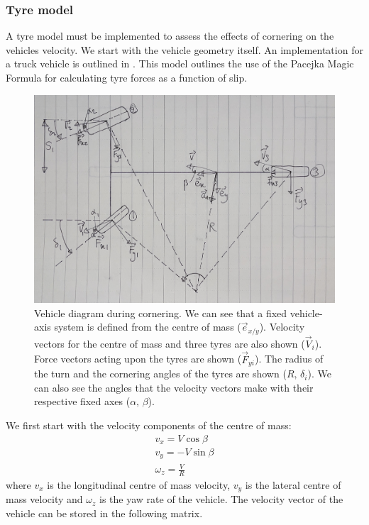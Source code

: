 \documentclass[11pt]{article}
\numberwithin{equation}{section}
\begin{document}
\subsubsection{Tyre model}
A tyre model must be implemented to assess the effects of cornering on the vehicles velocity. We start with the vehicle geometry itself. An implementation for a truck vehicle is outlined in \citep{BECKERS2020102360}. This model outlines the use of the Pacejka Magic Formula for calculating tyre forces as a function of slip.
\begin{figure}[H]
    \centering
    \includegraphics[width = \textwidth]{./img/vehicleSketch2.JPG}
    \caption{Vehicle diagram during cornering. We can see that a fixed vehicle-axis system is defined from the centre of mass ($\vec{e}_{x/y}$). Velocity vectors for the centre of mass and three tyres are also shown ($\vec{V}_i$). Force vectors acting upon the tyres are shown ($\vec{F}_{yi}$). The radius of the turn and the cornering angles of the tyres are shown ($R, \, \delta_i$). We can also see the angles that the velocity vectors make with their respective fixed axes ($\alpha, \, \beta$).}
\end{figure}
We first start with the velocity components of the centre of mass:
\begin{gather}
    v_x = V\cos\beta\\
    v_y = -V\sin\beta\\
    \omega_z = \frac{V}{R}
\end{gather}
where $v_x$ is the longitudinal centre of mass velocity, $v_y$ is the lateral centre of mass velocity and $\omega_z$ is the yaw rate of the vehicle. The velocity vector of the vehicle can be stored in the following matrix.
\end{document}
